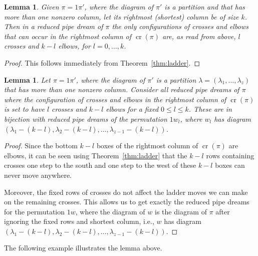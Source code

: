 \documentclass[10pt]{amsart}
\newtheorem{lemm}[theo]{Lemma}
\theoremstyle{definition}
\numberwithin{equation}{section}
\DeclareMathOperator{\rmcr}{cr}
\newcommand*\+{\smash{\lower2pt\hbox{\rlap{\vrule height14pt}}\raise2pt\hbox{\rlap{\hskip-3pt \vrule height.4pt depth0pt width14.7pt}}}}
\begin{document}
\begin{lemm}\label{lem:lastcol}
Given $\pi=1\pi'$, where the diagram of $\pi'$ is a partition and that has more than one nonzero column, let its rightmost (shortest) column be of size $k$. Then in a reduced pipe dream of $\pi$ the only configurations of crosses and elbows that can occur in the rightmost column of $\rmcr(\pi)$ are, as read from above, $l$ crosses and $k-l$ elbows, for $l=0,\dots,k$.
\end{lemm}

\begin{proof}
This follows immediately from Theorem~\ref{thm:ladder}.
\end{proof}

\begin{lemm}\label{lem:gen}
Let $\pi=1\pi'$, where the diagram of $\pi'$ is a partition $\lambda=(\lambda_1,\dots, \lambda_z)$ that has more than one nonzero column. Consider all reduced pipe dreams of $\pi$ where the configuration of crosses and elbows in the rightmost column of $\rmcr(\pi)$ is set to have $l$ crosses and $k-l$ elbows for a fixed $0\leq l\leq k$. These are in bijection with reduced pipe dreams of the permutation $1w_l$, where $w_l$ has diagram $(\lambda_1-(k-l), \lambda_2-(k-l), \dots, \lambda_{z-1}-(k-l))$.
\end{lemm}

\begin{proof}
Since the bottom $k-l$ boxes of the rightmost column of $\rmcr(\pi)$ are elbows, it can be seen using Theorem~\ref{thm:ladder} that the $k-l$ rows containing crosses one step to the south and one step to the west of these $k-l$ boxes can never move anywhere.

Moreover, the fixed rows of crosses do not affect the ladder moves we can make on the remaining crosses. This allows us to get exactly the reduced pipe dreams for the permutation $1w$, where the diagram of $w$ is the diagram of $\pi$ after ignoring the fixed rows and shortest column, i.e., $w$ has diagram $(\lambda_1-(k-l), \lambda_2-(k-l), \dots, \lambda_{z-1}-(k-l))$.
\end{proof}

The following example illustrates the lemma above.
\end{document}
